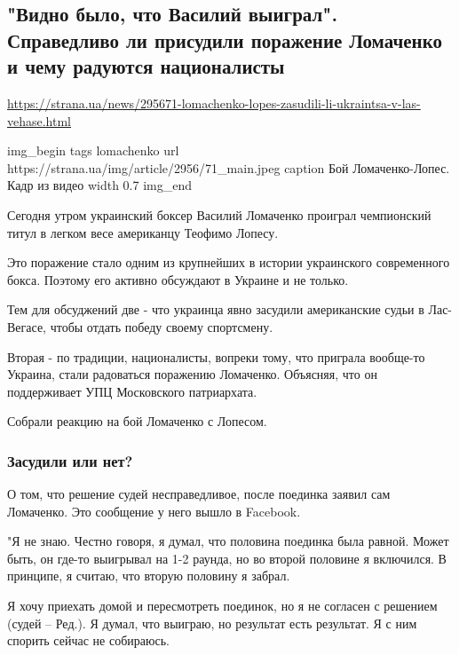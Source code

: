  
 

\subsection{"Видно было, что Василий выиграл". Справедливо ли присудили поражение Ломаченко и чему радуются националисты}

\url{https://strana.ua/news/295671-lomachenko-lopes-zasudili-li-ukraintsa-v-las-vehase.html}

\ifcmt
img_begin 
	tags lomachenko
	url https://strana.ua/img/article/2956/71_main.jpeg
	caption Бой Ломаченко-Лопес. Кадр из видео
	width 0.7
img_end
\fi

Сегодня утром украинский боксер Василий Ломаченко проиграл чемпионский титул в
легком весе американцу Теофимо Лопесу. 

Это поражение стало одним из крупнейших в истории украинского современного
бокса. Поэтому его активно обсуждают в Украине и не только. 

Тем для обсуджений две - что украинца явно засудили американские судьи в
Лас-Вегасе, чтобы отдать победу своему спортсмену.

Вторая - по традиции, националисты, вопреки тому, что приграла вообще-то
Украина, стали радоваться поражению Ломаченко. Объясняя, что он поддерживает
УПЦ Московского патриархата. 

Собрали реакцию на бой Ломаченко с Лопесом. 

\subsubsection{Засудили или нет?}

О том, что решение судей несправедливое, после поединка заявил сам Ломаченко.
Это сообщение у него вышло в Facebook. 

"Я не знаю. Честно говоря, я думал, что половина поединка была равной. Может
быть, он где-то выигрывал на 1-2 раунда, но во второй половине я включился. В
принципе, я считаю, что вторую половину я забрал.

Я хочу приехать домой и пересмотреть поединок, но я не согласен с решением
(судей – Ред.). Я думал, что выиграю, но результат есть результат. Я с ним
спорить сейчас не собираюсь.

